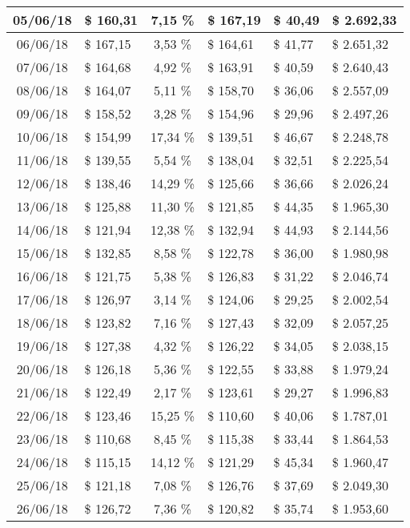 \begin{center}
\begin{small}
\begin{longtable}{|c|l|c|l|l|l|}
05/06/18 & \$ 160,31 & 7,15 \% & \$ 167,19 & \$ 40,49 & \$ 2.692,33 \\ \hline
06/06/18 & \$ 167,15 & 3,53 \% & \$ 164,61 & \$ 41,77 & \$ 2.651,32 \\ \hline
07/06/18 & \$ 164,68 & 4,92 \% & \$ 163,91 & \$ 40,59 & \$ 2.640,43 \\ \hline
08/06/18 & \$ 164,07 & 5,11 \% & \$ 158,70 & \$ 36,06 & \$ 2.557,09 \\ \hline
09/06/18 & \$ 158,52 & 3,28 \% & \$ 154,96 & \$ 29,96 & \$ 2.497,26 \\ \hline
10/06/18 & \$ 154,99 & 17,34 \% & \$ 139,51 & \$ 46,67 & \$ 2.248,78 \\ \hline
11/06/18 & \$ 139,55 & 5,54 \% & \$ 138,04 & \$ 32,51 & \$ 2.225,54 \\ \hline
12/06/18 & \$ 138,46 & 14,29 \% & \$ 125,66 & \$ 36,66 & \$ 2.026,24 \\ \hline
13/06/18 & \$ 125,88 & 11,30 \% & \$ 121,85 & \$ 44,35 & \$ 1.965,30 \\ \hline
14/06/18 & \$ 121,94 & 12,38 \% & \$ 132,94 & \$ 44,93 & \$ 2.144,56 \\ \hline
15/06/18 & \$ 132,85 & 8,58 \% & \$ 122,78 & \$ 36,00 & \$ 1.980,98 \\ \hline
16/06/18 & \$ 121,75 & 5,38 \% & \$ 126,83 & \$ 31,22 & \$ 2.046,74 \\ \hline
17/06/18 & \$ 126,97 & 3,14 \% & \$ 124,06 & \$ 29,25 & \$ 2.002,54 \\ \hline
18/06/18 & \$ 123,82 & 7,16 \% & \$ 127,43 & \$ 32,09 & \$ 2.057,25 \\ \hline
19/06/18 & \$ 127,38 & 4,32 \% & \$ 126,22 & \$ 34,05 & \$ 2.038,15 \\ \hline
20/06/18 & \$ 126,18 & 5,36 \% & \$ 122,55 & \$ 33,88 & \$ 1.979,24 \\ \hline
21/06/18 & \$ 122,49 & 2,17 \% & \$ 123,61 & \$ 29,27 & \$ 1.996,83 \\ \hline
22/06/18 & \$ 123,46 & 15,25 \% & \$ 110,60 & \$ 40,06 & \$ 1.787,01 \\ \hline
23/06/18 & \$ 110,68 & 8,45 \% & \$ 115,38 & \$ 33,44 & \$ 1.864,53 \\ \hline
24/06/18 & \$ 115,15 & 14,12 \% & \$ 121,29 & \$ 45,34 & \$ 1.960,47 \\ \hline
25/06/18 & \$ 121,18 & 7,08 \% & \$ 126,76 & \$ 37,69 & \$ 2.049,30 \\ \hline
26/06/18 & \$ 126,72 & 7,36 \% & \$ 120,82 & \$ 35,74 & \$ 1.953,60 \\ \hline

\end{longtable}
\end{small}
\end{center}
